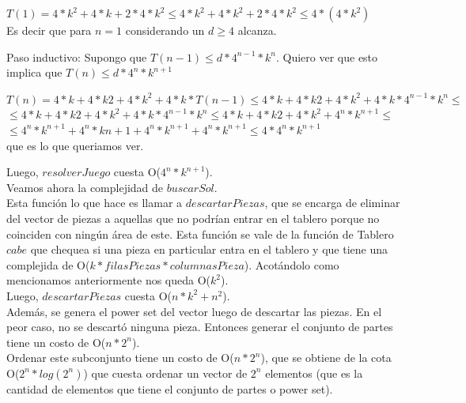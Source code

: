 \begin{center}
\indent  $T(1)=4* k^{2} + 4*k + 2 * 4* k^{2} \leq 4* k^{2} + 4*k^{2} + 2 * 4* k^{2} \leq 4* (4*k^2)$\\
\indent Es decir que para $n=1$ considerando un $d \geq 4 $ alcanza.\\
\end{center}

\indent Paso inductivo: Supongo  que $T(n-1) \leq  d * 4^{n-1}* k^{n}$. Quiero ver que esto implica que  $T(n) \leq  d * 4^{n}* k^{n+1}$\\

\begin{center}

\indent $T(n)= 4*k + 4*k{2} + 4*k^{2} + 4*k * T(n-1) \leq 4*k + 4*k{2} + 4*k^{2} + 4*k * 4^{n-1}* k^{n} \leq $\\

\indent $\leq 4*k + 4*k{2} + 4*k^{2} + 4*k * 4^{n-1}* k^{n} \leq 4*k + 4*k{2} + 4*k^{2} + 4^{n}* k^{n+1} \leq $ \\

\indent $\leq 4^{n}*k^{n+1} + 4^{n}*k{n+1} + 4^{n}*k^{n+1} + 4^{n}* k^{n+1} \leq 4* 4^{n}* k^{n+1}$\\

\indent que es lo que queriamos ver.\\
\end{center}


\indent Luego, $resolverJuego$ cuesta O($4^{n}*k^{n+1}$).\\

\indent Veamos ahora la complejidad de $buscarSol$.\\
\indent  Esta función lo que hace es llamar a $descartarPiezas$, que se encarga de eliminar del vector de piezas a aquellas que no podrían entrar en el tablero porque no coinciden con ningún área de este. Esta función se vale de la función de Tablero $cabe$ que chequea si una pieza en particular entra en el tablero y que tiene una complejida de O($k*filasPiezas*columnasPieza$). Acotándolo como mencionamos anteriormente nos queda O($k^{2}$).\\
\indent  Luego, $descartarPiezas$ cuesta O($n* k^{2} + n^{2}$).\\

\indent Además, se genera el power set del vector luego de descartar las piezas. En el peor caso, no se descartó ninguna pieza. Entonces generar el conjunto de partes tiene un costo de O($n * 2^{n}$).\\
\indent  Ordenar este subconjunto tiene un costo de O($n * 2^{n}$), que se obtiene de la cota O($2^{n} * log(2^{n})$) que cuesta ordenar un vector de $2^{n}$ elementos (que es la cantidad de elementos que tiene el conjunto de partes o power set).\\

